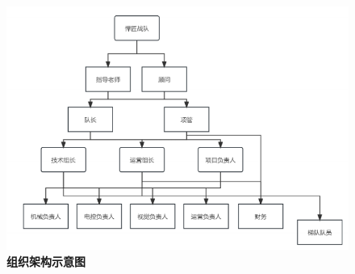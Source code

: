         \begin{figure}[H]
                    \centering
                    \includegraphics[height=0.9\textwidth]{figure/teamStructure_review.png}
                    \hspace{0.5em}
                    \caption{\textbf{\textbf{组织架构示意图}}}
                    \label{fig:teamStructure_review}
        \end{figure}